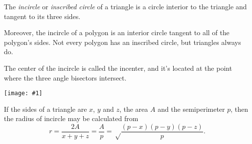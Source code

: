 \documentclass{article}
\newcommand{\figura}[1]{\begin{center}\texttt{[image: \#1]}\end{center}}
\begin{document}
The \emph{incircle} or \emph{inscribed circle} of a triangle is a circle interior to the triangle and tangent to its three sides. 

Moreover, the incircle of a polygon is an interior circle tangent to all of the polygon's sides. Not every polygon has an inscribed circle, but triangles always do.

The center of the incircle is called the incenter, and it's located at the point where the three angle bisectors intersect.
\figura{incentre}

If the sides of a triangle are $x$, $y$ and $z$, the area $A$ and the semiperimeter $p$, then the radius of incircle may be calculated from
$$r = \frac{2A}{x+y+z} = \frac{A}{p} = \sqrt\frac{(p-x)(p-y)(p-z)}{p}.$$
\end{document}
